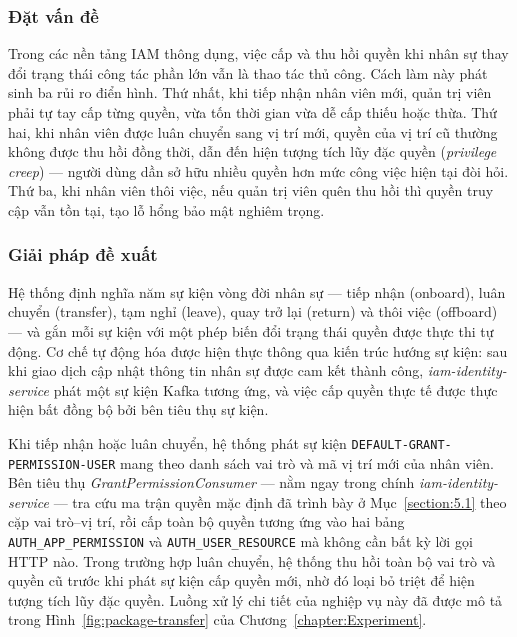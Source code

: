 \documentclass[../DoAn.tex]{subfiles}
\begin{document}
\subsubsection*{Đặt vấn đề}

Trong các nền tảng IAM thông dụng, việc cấp và thu hồi quyền khi nhân sự thay đổi trạng thái công tác phần lớn vẫn là thao tác thủ công. Cách làm này phát sinh ba rủi ro điển hình. Thứ nhất, khi tiếp nhận nhân viên mới, quản trị viên phải tự tay cấp từng quyền, vừa tốn thời gian vừa dễ cấp thiếu hoặc thừa. Thứ hai, khi nhân viên được luân chuyển sang vị trí mới, quyền của vị trí cũ thường không được thu hồi đồng thời, dẫn đến hiện tượng tích lũy đặc quyền (\textit{privilege creep}) --- người dùng dần sở hữu nhiều quyền hơn mức công việc hiện tại đòi hỏi. Thứ ba, khi nhân viên thôi việc, nếu quản trị viên quên thu hồi thì quyền truy cập vẫn tồn tại, tạo lỗ hổng bảo mật nghiêm trọng.

\subsubsection*{Giải pháp đề xuất}

Hệ thống định nghĩa năm sự kiện vòng đời nhân sự --- tiếp nhận (onboard), luân chuyển (transfer), tạm nghỉ (leave), quay trở lại (return) và thôi việc (offboard) --- và gắn mỗi sự kiện với một phép biến đổi trạng thái quyền được thực thi tự động. Cơ chế tự động hóa được hiện thực thông qua kiến trúc hướng sự kiện: sau khi giao dịch cập nhật thông tin nhân sự được cam kết thành công, \textit{iam-identity-service} phát một sự kiện Kafka tương ứng, và việc cấp quyền thực tế được thực hiện bất đồng bộ bởi bên tiêu thụ sự kiện.

Khi tiếp nhận hoặc luân chuyển, hệ thống phát sự kiện \texttt{DEFAULT-GRANT-PERMISSION-USER} mang theo danh sách vai trò và mã vị trí mới của nhân viên. Bên tiêu thụ \textit{GrantPermissionConsumer} --- nằm ngay trong chính \textit{iam-identity-service} --- tra cứu ma trận quyền mặc định đã trình bày ở Mục~\ref{section:5.1} theo cặp vai trò--vị trí, rồi cấp toàn bộ quyền tương ứng vào hai bảng \texttt{AUTH\_APP\_PERMISSION} và \texttt{AUTH\_USER\_RESOURCE} mà không cần bất kỳ lời gọi HTTP nào. Trong trường hợp luân chuyển, hệ thống thu hồi toàn bộ vai trò và quyền cũ trước khi phát sự kiện cấp quyền mới, nhờ đó loại bỏ triệt để hiện tượng tích lũy đặc quyền. Luồng xử lý chi tiết của nghiệp vụ này đã được mô tả trong Hình~\ref{fig:package-transfer} của Chương~\ref{chapter:Experiment}.
\end{document}

